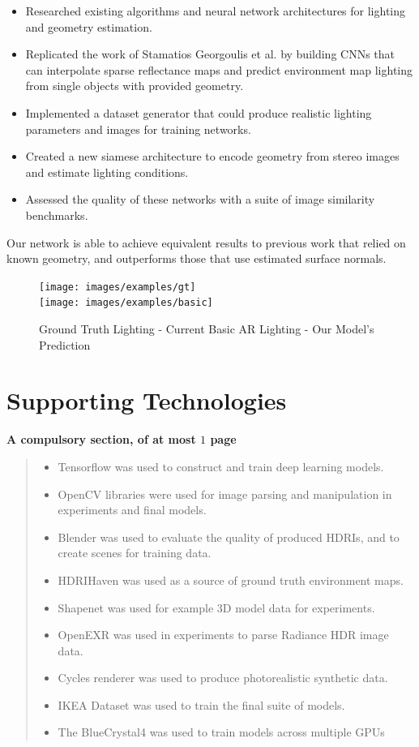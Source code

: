 \documentclass[ %
                    author={Gavin Parker},
                supervisor={Dr. Neill Campbell},
                    degree={MEng},
                     title={Deep Siamese Networks for Illumination Estimation from Stereo Images},
                  subtitle={},
                      type={research},
                      year={2018} ]{dissertation}
\begin{document}
\noindent
\begin{itemize}
\item Researched existing algorithms and neural network architectures for lighting and geometry estimation.
\item Replicated the work of Stamatios Georgoulis et al. by building CNNs that can interpolate sparse reflectance maps and predict environment map lighting from single objects with provided geometry.
\item Implemented a dataset generator that could produce realistic lighting parameters and images for training networks.
\item Created a new siamese architecture to encode geometry from stereo images and estimate lighting conditions.
\item Assessed the quality of these networks with a suite of image similarity benchmarks.
\end{itemize}

Our network is able to achieve equivalent results to previous work that relied on known geometry, and outperforms those that use estimated surface normals.

\begin{figure}
\centering
\texttt{[image: images/examples/gt]}\\
    \vspace{0.5cm}
\texttt{[image: images/examples/basic]}

\caption{Ground Truth Lighting - Current Basic AR Lighting - Our Model's Prediction}
\label{example_1}
\end{figure}
\chapter*{Supporting Technologies}

{\bf A compulsory section, of at most $1$ page}
\vspace{1cm} 
\begin{quote}
\noindent
\begin{itemize}
\item Tensorflow was used to construct and train deep learning models.
\item OpenCV libraries were used for image parsing and manipulation in experiments and final models.
\item Blender was used to evaluate the quality of produced HDRIs, and to create scenes for training data.
\item HDRIHaven was used as a source of ground truth environment maps.
\item Shapenet was used for example 3D model data for experiments.
\item OpenEXR was used in experiments to parse Radiance HDR image data.
\item Cycles renderer was used to produce photorealistic synthetic data.
\item IKEA Dataset was used to train the final suite of models.
\item The BlueCrystal4 was used to train models across multiple GPUs
\end{itemize}
\end{quote}
\end{document}
